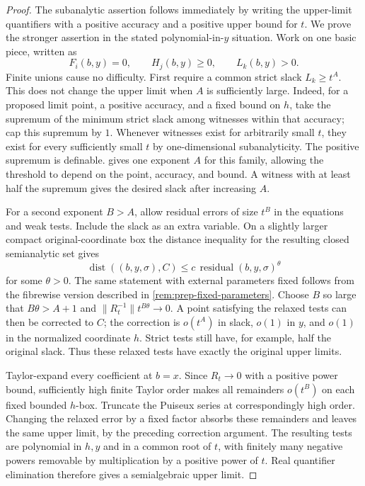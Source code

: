 \begin{proof}
The subanalytic assertion follows immediately by writing the upper-limit quantifiers with a positive accuracy and a positive upper bound for $t$. We prove the stronger assertion in the stated polynomial-in-$y$ situation. Work on one basic piece, written as
\[
 F_i(b,y)=0,\qquad H_j(b,y)\geq0,\qquad L_k(b,y)>0.
\]
Finite unions cause no difficulty. First require a common strict slack $L_k\geq t^A$. This does not change the upper limit when $A$ is sufficiently large. Indeed, for a proposed limit point, a positive accuracy, and a fixed bound on $h$, take the supremum of the minimum strict slack among witnesses within that accuracy; cap this supremum by $1$. Whenever witnesses exist for arbitrarily small $t$, they exist for every sufficiently small $t$ by one-dimensional subanalyticity. The positive supremum is definable.  gives one exponent $A$ for this family, allowing the threshold to depend on the point, accuracy, and bound. A witness with at least half the supremum gives the desired slack after increasing $A$.

For a second exponent $B>A$, allow residual errors of size $t^B$ in the equations and weak tests. Include the slack as an extra variable. On a slightly larger compact original-coordinate box the distance inequality for the resulting closed semianalytic set gives
\[
 \operatorname{dist}((b,y,\sigma),C)
      \leq c\,\operatorname{residual}(b,y,\sigma)^{\theta}
\]
for some $\theta>0$. The same statement with external parameters fixed follows from the fibrewise version described in \cref{rem:prep-fixed-parameters}. Choose $B$ so large that $B\theta>A+1$ and $\|R_t^{-1}\|t^{B\theta}\to0$. A point satisfying the relaxed tests can then be corrected to $C$; the correction is $o(t^A)$ in slack, $o(1)$ in $y$, and $o(1)$ in the normalized coordinate $h$. Strict tests still have, for example, half the original slack. Thus these relaxed tests have exactly the original upper limits.

Taylor-expand every coefficient at $b=x$. Since $R_t\to0$ with a positive power bound, sufficiently high finite Taylor order makes all remainders $o(t^B)$ on each fixed bounded $h$-box. Truncate the Puiseux series at correspondingly high order. Changing the relaxed error by a fixed factor absorbs these remainders and leaves the same upper limit, by the preceding correction argument. The resulting tests are polynomial in $h,y$ and in a common root of $t$, with finitely many negative powers removable by multiplication by a positive power of $t$. Real quantifier elimination therefore gives a semialgebraic upper limit.


\end{proof}
